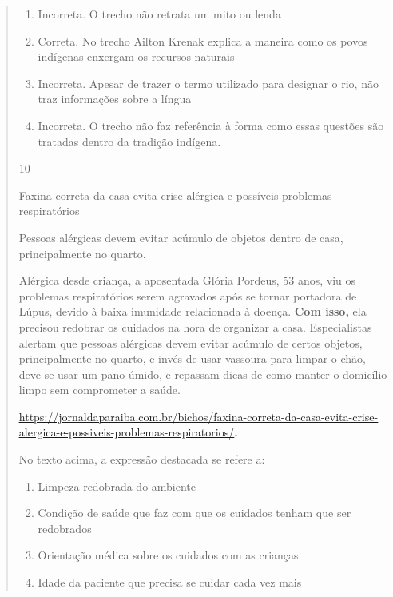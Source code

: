 {\begin{quote}
{\begin{itemize}
\begin{itemize}
\begin{enumerate}
\def\labelenumi{\arabic{enumi}.}
\item
  Incorreta. O trecho não retrata um mito ou lenda
\item
  Correta. No trecho Ailton Krenak explica a maneira como os povos
  indígenas enxergam os recursos naturais
\item
  Incorreta. Apesar de trazer o termo utilizado para designar o rio, não
  traz informações sobre a língua
\item
  Incorreta. O trecho não faz referência à forma como essas questões são
  tratadas dentro da tradição indígena.
\end{enumerate}

\num{10}

Faxina correta da casa evita crise alérgica e possíveis problemas
respiratórios

Pessoas alérgicas devem evitar acúmulo de objetos dentro de casa,
principalmente no quarto.

Alérgica desde criança, a aposentada Glória Pordeus, 53 anos, viu os
problemas respiratórios serem agravados após se tornar portadora de
Lúpus, devido à baixa imunidade relacionada à doença. \textbf{Com isso,}
ela precisou redobrar os cuidados na hora de organizar a casa.
Especialistas alertam que pessoas alérgicas devem evitar acúmulo de
certos objetos, principalmente no quarto, e invés de usar vassoura para
limpar o chão, deve-se usar um pano úmido, e repassam dicas de como
manter o domicílio limpo sem comprometer a saúde.

\href{https://jornaldaparaiba.com.br/bichos/faxina-correta-da-casa-evita-crise-alergica-e-possiveis-problemas-respiratorios/}{\uline{https://jornaldaparaiba.com.br/bichos/faxina-correta-da-casa-evita-crise-alergica-e-possiveis-problemas-respiratorios/}}\textbf{.}

No texto acima, a expressão destacada se refere a:

\begin{enumerate}

\item
  Limpeza redobrada do ambiente
\item
  Condição de saúde que faz com que os cuidados tenham que ser
  redobrados
\item
  Orientação médica sobre os cuidados com as crianças
\item
  Idade da paciente que precisa se cuidar cada vez mais
\end{enumerate}


\end{itemize}
\end{itemize}}
\end{quote}}

